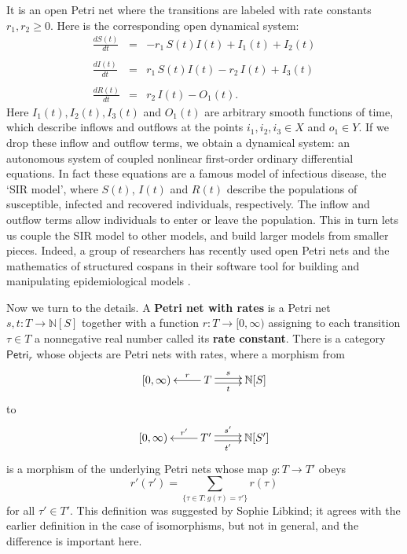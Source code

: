 \documentclass[ a4paper, onecolumn, superscriptaddress,10pt, accepted=2022-02-14, issue=3, volume=4, shorttitle=papers/compositionality-4-3 ]{compositionalityarticle}
\newcommand{\N}{\mathbb{N}}
\let\maps\colon
\newcommand{\Petri}{\mathsf{Petri}}
\newcommand{\define}[1]{{\rm \textbf{#1}}}
\begin{document}
It is an open Petri net where the transitions are labeled with rate constants $r_1, r_2 \geq 0$.
Here is the corresponding open dynamical system:
\begin{equation}
\label{eq:openPetrir}
  \begin{array}{ccl} \displaystyle{\frac{dS(t)}{dt}} &=& -r_1 \, S(t)I(t)  + I_1(t) + I_2(t) \\ \\
\displaystyle{\frac{dI(t)}{dt}}  &=& r_1\, S(t)I(t) - r_2 \, I(t) + I_3(t)  \\  \\
\displaystyle{\frac{dR(t)}{dt}}  &=&   r_2 \, I(t)  - O_1(t).
\end{array}
\end{equation}
Here $I_1(t),I_2(t),I_3(t)$ and $O_1(t)$ are arbitrary smooth functions of time, which describe inflows and outflows at the points $i_1,i_2,i_3 \in X$ and $o_1 \in Y$.
If we drop these inflow and outflow terms, we obtain a dynamical system: an autonomous system of coupled nonlinear first-order ordinary differential equations.   In fact these equations are a famous model of infectious disease, the `SIR model', where $S(t)$, $I(t)$ and $R(t)$ describe the populations of susceptible, infected and recovered individuals, respectively.   The inflow and outflow terms allow individuals to enter or leave the population.   This in turn lets us couple the SIR model to other models, and build larger models from smaller pieces.    Indeed, a group of researchers has recently used open Petri nets and the mathematics of structured cospans in their software tool for building and manipulating epidemiological models \cite{AP,BFMLP}.

Now we turn to the details.  A \define{Petri net with rates} is a Petri net $s,t \maps T \to \N[S]$ together with a function $r \maps T \to [0,\infty)$ assigning to each transition $\tau \in T$ a nonnegative real number called its \define{rate constant}.  There is a category $\Petri_r$ whose objects are Petri nets with rates, where a morphism from
\[   \xymatrix{ [0,\infty) & T \ar[l]_-r \ar@<-.5ex>[r]_-t \ar@<.5ex>[r]^-s & \N[S] }\]
 to
 \[   \xymatrix{ [0,\infty) & T' \ar[l]_-{r'} \ar@<-.5ex>[r]_-{t'} \ar@<.5ex>[r]^-{s'} & \N[S'] }\]
is a morphism of the underlying Petri nets whose map $g \maps T \to T'$ obeys
\[    r'(\tau') = \sum_{\{\tau \in T: g(\tau) = \tau'\}} r(\tau) \]
for all $\tau' \in T'$.   This definition was suggested by Sophie Libkind; it agrees with the earlier definition \cite{BP} in the case of isomorphisms, but not in general, and the difference is important here.
\end{document}
